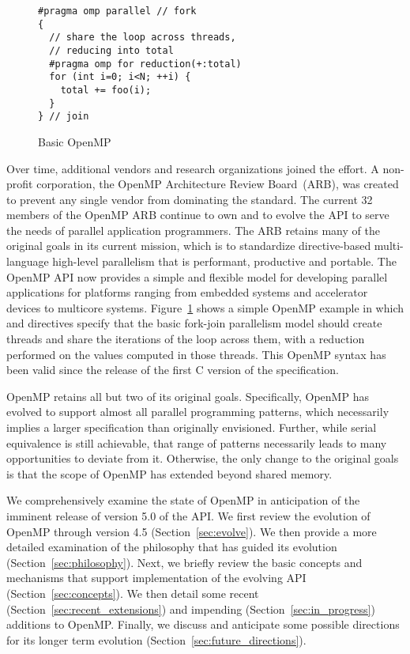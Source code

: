 \begin{figure}
\begin{verbatim}
#pragma omp parallel // fork
{
  // share the loop across threads,
  // reducing into total
  #pragma omp for reduction(+:total)
  for (int i=0; i<N; ++i) {
    total += foo(i);
  }
} // join
\end{verbatim}
\caption{Basic OpenMP\label{fig:basic}}
\end{figure}

Over time, additional vendors and research organizations joined the effort.  A
non-profit corporation, the OpenMP Architecture Review Board~(ARB), was created
to prevent any single vendor from dominating the standard. The current 32
members of the OpenMP ARB continue to own and to evolve the API to serve the
needs of parallel application programmers. The ARB retains many of the original
goals in its current mission, which is to standardize directive-based
multi-language high-level parallelism that is performant, productive and
portable. The OpenMP API now provides a simple and flexible model 
for developing parallel applications for platforms ranging from embedded
systems and accelerator devices to multicore systems. Figure~\ref{fig:basic}
shows a simple OpenMP example in which  and 
directives specify that the basic fork-join parallelism model should 
create threads and share the iterations of the loop across them, with 
a reduction performed on the values computed in those threads. This
OpenMP syntax has been valid since the release of the first C version of
the specification.

OpenMP retains all but two of its original goals. Specifically, OpenMP has 
evolved to support almost all parallel programming patterns, which necessarily
implies a larger specification than originally envisioned. Further, while 
serial equivalence is still achievable, that range of patterns necessarily 
leads to many opportunities to deviate from it. Otherwise, the only change 
to the original goals is that the scope of OpenMP has extended beyond 
shared memory. 

We comprehensively examine the state of OpenMP in anticipation of the imminent 
release of version 5.0 of the API. We first review the evolution of OpenMP 
through version 4.5 (Section~\ref{sec:evolve}). We then provide a more 
detailed examination of the philosophy that has guided its evolution 
(Section~\ref{sec:philosophy}). Next, we briefly review the basic concepts 
and mechanisms that support implementation of the evolving API 
(Section~\ref{sec:concepts}). We then detail some recent 
(Section~\ref{sec:recent_extensions}) and impending 
(Section~\ref{sec:in_progress}) additions to OpenMP. Finally, we discuss
and anticipate some possible directions for its longer term evolution
(Section~\ref{sec:future_directions}).
